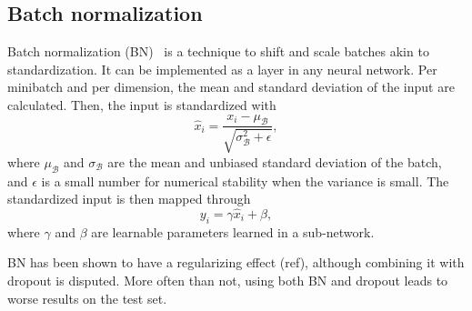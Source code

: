 \subsection{Batch normalization}\label{sec:bn}
Batch normalization (BN)~\cite{Ioffe2015} is a technique to shift and scale batches akin to standardization.
It can be implemented as a layer in any neural network.
Per minibatch and per dimension, the mean and standard deviation of the input are calculated.
Then, the input is standardized with
\begin{equation}
    \hat{x}_i = \frac{x_i - \mu_\mathcal{B}}{\sqrt{\sigma_\mathcal{B}^2 + \epsilon}},
\end{equation}
where $\mu_\mathcal{B}$ and $\sigma_\mathcal{B}$ are the mean and unbiased standard deviation of the batch, and $\epsilon$ is a small number for numerical stability when the variance is small.
The standardized input is then mapped through
\begin{equation}
    y_i = \gamma \hat{x}_i + \beta,
\end{equation}
where $\gamma$ and $\beta$ are learnable parameters learned in a sub-network.

BN has been shown to have a regularizing effect (ref), although combining it with dropout is disputed.
More often than not, using both BN and dropout leads to worse results on the test set.

